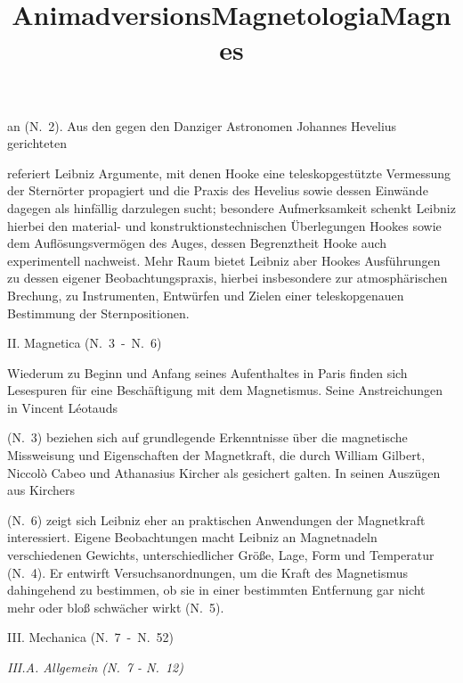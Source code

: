  an (N.~2). Aus den gegen den Danziger Astronomen Johannes Hevelius\protect{} gerichteten \title{Animadversions} referiert Leibniz Argumente, mit denen Hooke eine teleskopgestützte Vermessung der Sternörter\protect{} propagiert und die Praxis des Hevelius sowie dessen Einwände dagegen als hinfällig darzulegen sucht; besondere Aufmerksamkeit schenkt Leibniz hierbei den material- und konstruktionstechnischen Überlegungen Hookes sowie dem Auflösungsvermögen des Auges, dessen Begrenztheit Hooke auch experimentell nachweist. Mehr Raum bietet Leibniz aber \mbox{Hookes} Ausführungen zu dessen eigener Beobachtungspraxis, hierbei insbesondere zur atmosphärischen Brechung, zu Instrumenten, Entwürfen und Zielen einer teleskopgenauen Bestimmung der Sternpositionen.\par\vspace{3.0ex}
 \newpage
\noindent
II. Magnetica (N.~3\ -\ N.~6)\par\vspace{1.0ex}
\noindent
Wiederum zu Beginn und Anfang seines Aufenthaltes in Paris finden sich Lesespuren für eine Beschäftigung mit dem Magnetismus\protect{}. Seine Anstreichungen in Vincent Léotauds\cite{01061} \title{Magnetologia} (N.~3) beziehen sich auf grundlegende Erkenntnisse über die magnetische Missweisung\protect{} und Eigenschaften der Magnetkraft\protect{}, die durch William Gilbert\protect{}, Niccolò Cabeo\protect{} und Athanasius Kircher\protect{} als gesichert galten. In seinen Auszügen aus Kirchers \title{Magnes} (N.~6) zeigt sich Leibniz eher an praktischen Anwendungen der Magnetkraft interessiert. Eigene Beobachtungen macht Leibniz an Magnetnadeln verschiedenen Gewichts, unterschiedlicher Grö{\ss}e, Lage, Form und Temperatur (N.~4). Er entwirft Versuchsanordnungen, um die Kraft des Magnetismus dahingehend zu bestimmen, ob sie in einer bestimmten Entfernung gar nicht mehr oder blo{\ss} schwächer wirkt (N.~5).
\par\vspace{3.0ex}
\noindent
III. Mechanica (N.~7\ -\ N.~52)\par\vspace{2.0ex}
\noindent
\textit{III.A. Allgemein (N.~7 - N.~12)}
\par\noindent
